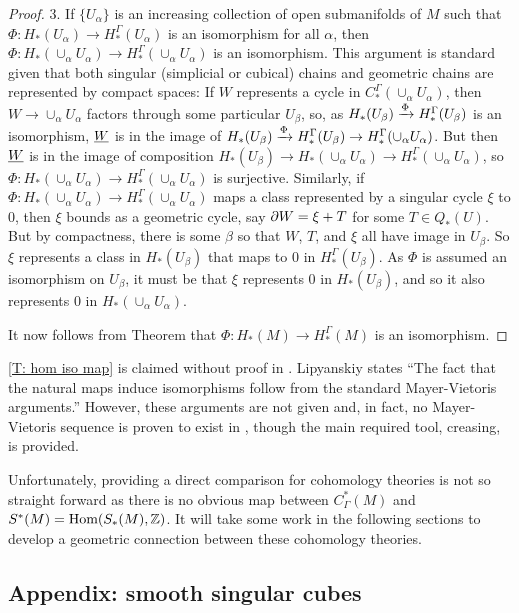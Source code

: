 \begin{proof}
3. If $\{U_\alpha\}$ is an increasing collection of open submanifolds of $M$ such that $\Phi:H_*(U_\alpha)\to H_*^\Gamma(U_\alpha)$ is an isomorphism for all $\alpha$, then $\Phi:H_*(\cup_\alpha U_\alpha)\to H_*^\Gamma(\cup_\alpha U_\alpha)$ is an isomorphism. This argument is standard given that both singular (simplicial or cubical) chains and geometric chains are represented by compact spaces: If $W$ represents a cycle in $C_*^\Gamma(\cup_\alpha U_\alpha)$, then $W\to \cup_\alpha U_\alpha$ factors through some particular $U_\beta$, so, as $H_*(U_\beta)\xrightarrow{\Phi}H_*^\Gamma(U_\beta)$ is an isomorphism, $\underline{W}$ is in the image of $H_*(U_\beta)\xrightarrow{\Phi}H_*^\Gamma(U_\beta)\to H_*^\Gamma(\cup_\alpha U_\alpha)$. But then $\underline{W}$ is in the image of composition $H_*(U_\beta)\to H_*(\cup_\alpha U_\alpha)\to H_*^\Gamma(\cup_\alpha U_\alpha)$, so $\Phi:H_*(\cup_\alpha U_\alpha)\to H_*^\Gamma(\cup_\alpha U_\alpha)$ is surjective. Similarly, if $\Phi:H_*(\cup_\alpha U_\alpha)\to H_*^\Gamma(\cup_\alpha U_\alpha)$ maps a class represented by a singular cycle $\xi$ to $0$, then $\xi$ bounds as a geometric cycle, say $\partial W=\xi+T$ for some $T\in Q_*(U)$. But by compactness, there is some $\beta$ so that $W$, $T$, and $\xi$ all have image in $U_\beta$. So $\xi$ represents a class in $H_*(U_\beta)$ that maps to $0$ in $H_*^\Gamma(U_\beta)$. As $\Phi$ is assumed an isomorphism on $U_\beta$, it must be that $\xi$ represents $0$ in $H_*(U_\beta)$, and so it also represents $0$ in $H_*(\cup_\alpha U_\alpha)$.

It now follows from Theorem \cite[5.1.1]{Frie20} that $\Phi: H_*(M)\to H_*^\Gamma(M)$  is an isomorphism.
\end{proof}


\cref{T: hom iso map} is claimed without proof in \cite[Section 10]{Lipy14}. Lipyanskiy states ``The fact that the natural maps induce isomorphisms follow from the standard Mayer-Vietoris arguments.'' However, these arguments are not given and, in fact, no Mayer-Vietoris sequence is proven to exist in \cite{Lipy14}, though the main required tool, creasing, is provided.

Unfortunately, providing a direct comparison for cohomology theories is not so straight forward as there is no obvious map between $C^*_\Gamma(M)$ and $S^*(M)=\textup{Hom}(S_*(M),\mathbb{Z})$. It will take some work in the following sections to develop a geometric connection between these cohomology theories.


\subsection{Appendix: smooth singular cubes}


